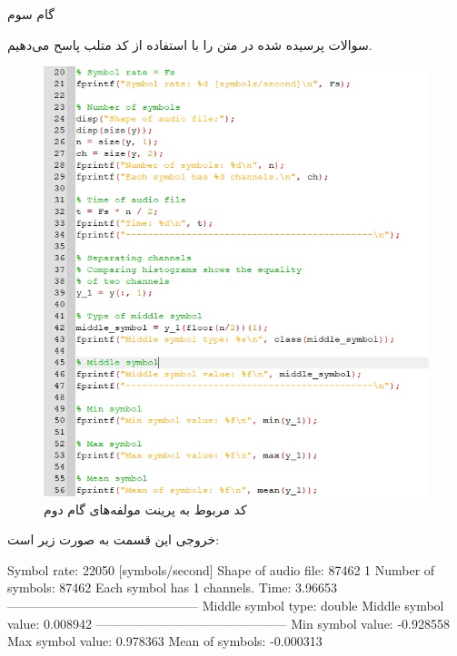 \Problem
{گام سوم}
{
سوالات پرسیده شده در متن را با استفاده از کد متلب پاسح می‌دهیم.

\begin{figure}[H]
    \includegraphics[width=15cm]{Images/step_3_code.jpg}
    \centering
    \caption{کد مربوط به پرینت مولفه‌های گام دوم}
\end{figure}

خروجی این قسمت به صورت زیر است:
\begin{latin}
\newline
Symbol rate: 22050 [symbols/second]
\newline
Shape of audio file: 87462       1
\newline
Number of symbols: 87462
\newline
Each symbol has 1 channels.
\newline
Time: 3.96653
\newline
---------------------------------------------
\newline
Middle symbol type: double
\newline
Middle symbol value: 0.008942
\newline
---------------------------------------------
\newline
Min symbol value: -0.928558
\newline
Max symbol value: 0.978363
\newline
Mean of symbols: -0.000313
\end{latin}

}
